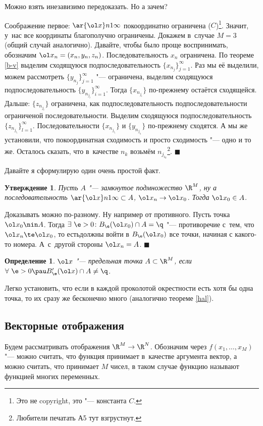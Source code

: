 \documentclass[a4paper,10pt,twoside]{article}
\newtheorem{Def}{Определение}[section]
\newtheorem{Ut}{Утверждение}[section]
\newenvironment{Proof}
       {\par\noindent{\textbf{Доказательство.}}}
       {\hfill$\scriptstyle\blacksquare$}
\begin{document}
	 Можно взять инезавизимо передоказать. Но а зачем?
	 \begin{Proof}
	 Соображение первое: $\ar{\ol x}n1\infty$ покоординатно ограничена ($C$)\footnote{Это не copyright, это "--- константа $C$.}.
	 Значит, у~нас все координаты благополучно ограничены. Докажем в~случае $M=3$ (общий случай аналогично). Давайте,
	 чтобы было проще воспринимать, обозначим $\ol x_n = (x_n,y_n,z_n)$. Последовательность
	 $x_n$ ограничена. По теореме \ref{b-v} выделим сходящуюся подпоследовательность $\big\{x_{n_j}\big\}_{j=1}^\infty$. 
	 Раз мы её выделили, можем рассмотреть $\big\{y_{n_j}\big\}_{j=1}^\infty$ "--- ограничена, выделим сходящуюся подпоследовательность
	 $\Big\{y_{n_{j_i}}\Big\}_{i=1}^\infty$.  Тогда $\big\{x_{n_{j_i}}\big\}$ по-прежнему остаётся сходящейся.
	 Дальше: $\Big\{z_{n_{j_i}}\Big\}$ ограничена, как подпоследовательность подпоследовательности ограниченой последовательности.
	 Выделим сходящуюся подпоследовательность $\Big\{z_{n_{j_{i_l}}}\Big\}_{l=1}^\infty$. 
	 Последовательности $\Big\{x_{n_{j_{i_l}}}\Big\}$  и $\Big\{y_{n_{j_{i_l}}}\Big\}$ по-прежнему сходятся.
	 А мы же установили, что покоординатная сходимость и просто сходимость "--- одно и то же. Осталось сказать, что 
	 в~качестве $n_k$ возьмём $n_{j_{i_k}}$\footnote{Любители печатать А5 тут взгрустнут.}.
	 \end{Proof}
	 
	 Давайте я сформулирую один очень простой факт.
	 \begin{Ut}
	 Пусть $A$ "--- замкнутое подмножество $\R^M$, ну а последовательность $\ar{\ol x}n1\infty\subset A$, $\ol x_n\to \ol x_0$. Тогда
	 $\ol x_0\in A$.
	 \end{Ut}
	 \begin{Proof}
	 Доказывать можно по-разному. Ну например от противного. Пусть точка $\ol x_0\nin A$. Тогда $\exists\ \e>0\colon B_\e(\ol x_0)\cap A=\q$
	 "--- противоречие с~тем, что $\ol x_n\te\ol x_0$, то естьдолжны войти в $B_\e(\ol x_0)$ все точки, начиная с какого-то номера. А~с~другой
	 стороны $\ol x_n = A$. 
	 \end{Proof}
	 \begin{Def}
	 $\ol x$ "--- предельная точка $A\subset \R^M$, если $\forall\ \e>0\pau B'_\e(\ol x)\cap A \neq \q$.
	 \end{Def}
	 Легко установить, что если в каждой проколотой окрестности есть хотя бы одна точка, то их сразу же бесконечно много (аналогично теореме \ref{hal}).
	 \subsection{Векторные отображения}
	 Будем рассматривать отображения $\R^M\to \R^N$. Обозначим через $f(x_1,\ldots,x_M)$ "--- можно считать, что функция
	 принимает в~качестве аргумента вектор, а можно считать, что принимает $M$ чисел, в таком случае функцию называют функцией многих переменных.
	 
\end{document}
